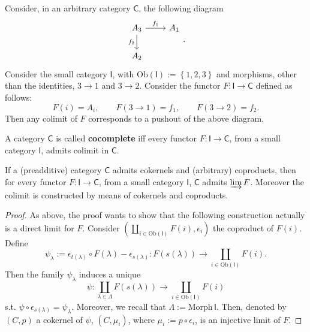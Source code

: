 \begin{ex}
	Consider, in an arbitrary category $\mathsf{C}$, the following diagram
	\begin{equation}
	\begin{tikzcd}
		A_3 \arrow[r, "f_1", rightarrow] \arrow[d, "f_2"', rightarrow] &
		A_1\\
		A_2
	\end{tikzcd}
	.\end{equation} 
	Consider the small category $\mathsf{I}$, with $\mathrm{Ob} \left(\mathsf{I}\right) := \left\{ 1, 2, 3 \right\}$ and morphisms, other than the identities, $3 \to 1$ and $3 \to 2$.
	Consider the functor $F: \mathsf{I} \to \mathsf{C}$ defined as follows:
	\begin{equation}
		F(i) = A_i, \qquad F( 3 \to 1 ) = f_1, \qquad
		F( 3 \to 2 ) = f_2
	.\end{equation} 
	Then any colimit of $F$ corresponds to a pushout of the above diagram.
\end{ex} 

\begin{defn}
	A category $\mathsf{C}$ is called \textbf{cocomplete} iff every functor $F: \mathsf{I} \to \mathsf{C}$, from a small category $\mathsf{I}$, admits colimit in $\mathsf{C}$.
\end{defn}

\begin{prop}\label{prop:ColimConstr}
	If a (preadditive) category $\mathsf{C}$ admits cokernels and (arbitrary) coproducts, then
	for every functor $F: \mathsf{I} \to \mathsf{C}$, from a small category $\mathsf{I}$, $\mathsf{C}$ admits $\varinjlim F$.
	Moreover the colimit is constructed by means of cokernels and coproducts.
\end{prop} 
\begin{proof}
	As above, the proof wants to show that the following construction actually is a direct limit for $F$.
	Consider $\left(\coprod_{i \in \mathrm{Ob} \left(\mathsf{I}\right)} F(i), \epsilon_i\right)$ the coproduct of $F(i)$.
	Define
	\begin{equation}
		\psi_\lambda := \epsilon_{t(\lambda)} \circ F(\lambda) - \epsilon_{s(\lambda)}:
		F \left( s(\lambda)  \right) \to \coprod_{i \in \mathrm{Ob} \left(\mathsf{I}\right)} F(i)
	.\end{equation} 
	Then the family $\psi_\lambda$ induces a unique 
	\begin{equation}
		\psi: \coprod_{\lambda \in \Lambda} F \left( s(\lambda) \right) \to \coprod_{i \in \mathrm{Ob} \left(\mathsf{I}\right)} F(i)
	\end{equation} 
	s.t. $\psi \circ \epsilon_{s(\lambda)} = \psi_\lambda$.
	Moreover, we recall that $\Lambda := \mathrm{Morph}\, \mathsf{I}$.
	Then, denoted by $\left(C, p\right)$ a cokernel of $\psi$, $\left(C, \mu_i\right)$, where $\mu_i := p \circ\epsilon_i$, is an injective limit of $F$.
\end{proof}

